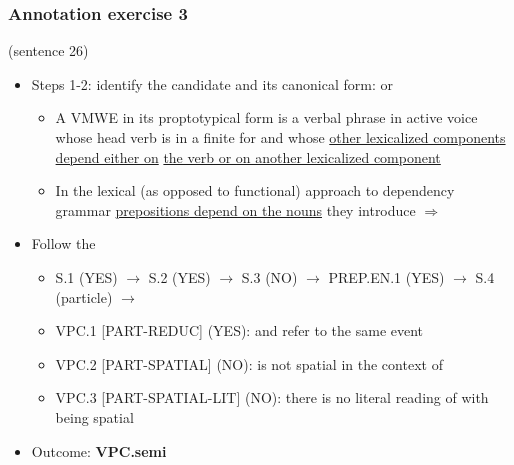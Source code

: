 \documentclass[xcolor=dvipsnames]{beamer}
\begin{document}
\begin{frame} 
\frametitle{Annotation exercise 3}

 (sentence 26)
\pause
\begin{scriptsize}
\begin{block}{}
\begin{itemize}
\item Steps 1-2: identify the candidate and its canonical form:  or 
   \begin{itemize}
   \item A VMWE in its proptotypical form is a verbal phrase in active voice whose head verb is in a finite for and whose \underline{other lexicalized components depend either on} \underline{the verb or on another lexicalized component}
   \item In the lexical (as opposed to functional) approach to dependency grammar \underline{prepositions depend on the nouns} they introduce $\Rightarrow$ 
   \end{itemize}
\item Follow the \href{http://parsemefr.lif.univ-mrs.fr/parseme-st-guidelines/1.3/?page=040\_Annotation\_process\_-\_decision\_tree}{}
   \begin{itemize}
   \item S.1 (YES) $\rightarrow$ S.2 (YES) $\rightarrow$ S.3 (NO) $\rightarrow$ PREP.EN.1 (YES) $\rightarrow$ S.4 (particle) $\rightarrow$
   \item VPC.1 [PART-REDUC] (YES):  and  refer to the same event
   \item VPC.2 [PART-SPATIAL] (NO):  is not spatial in the context of 
   \item VPC.3 [PART-SPATIAL-LIT] (NO): there is no literal reading of  with  being spatial
   \end{itemize}
\item Outcome: \textbf{VPC.semi}
\end{itemize}
\end{block}

\end{scriptsize}

\end{frame}
\end{document}
